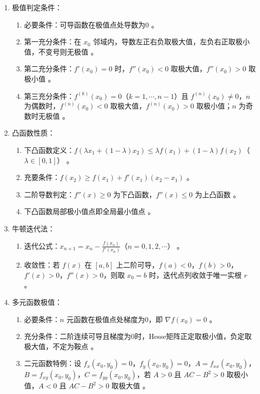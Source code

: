 \documentclass[UTF8]{ctexart}
\theoremstyle{remark}
\begin{document}
\begin{enumerate}
	\item 极值判定条件：
	\begin{enumerate}
		\item 必要条件：可导函数在极值点处导数为0 。
		\item 第一充分条件：在 \(x_0\) 邻域内，导数左正右负取极大值，左负右正取极小值，不变号则无极值 。
		\item 第二充分条件：\(f'(x_0) = 0\) 时，\(f''(x_0) < 0\) 取极大值，\(f''(x_0) > 0\) 取极小值 。
		\item 第三充分条件：\(f^{(k)}(x_0) = 0\)（\(k = 1, \cdots, n - 1\)）且 \(f^{(n)}(x_0) \neq 0\)，\(n\) 为偶数时，\(f^{(n)}(x_0) < 0\) 取极大值，\(f^{(n)}(x_0) > 0\) 取极小值；\(n\) 为奇数时无极值 。
	\end{enumerate}
	
	\item 凸函数性质：
	\begin{enumerate}
		\item 下凸函数定义：\(f(\lambda x_1 + (1 - \lambda) x_2) \leq \lambda f(x_1) + (1 - \lambda) f(x_2)\)（\(\lambda \in [0, 1]\)） 。
		\item 充要条件：\(f(x_2) \geq f(x_1) + f'(x_1)(x_2 - x_1)\) 。
		\item 二阶导数判定：\(f''(x) \geq 0\) 为下凸函数，\(f''(x) \leq 0\) 为上凸函数 。
		\item 下凸函数局部极小值点即全局最小值点 。
	\end{enumerate}
	
	\item 牛顿迭代法：
	\begin{enumerate}
		\item 迭代公式：\(x_{n+1} = x_n - \frac{f(x_n)}{f'(x_n)}\)（\(n = 0, 1, 2, \cdots\)） 。
		\item 收敛性：若 \(f(x)\) 在 \([a, b]\) 上二阶可导，\(f(a) < 0\)，\(f(b) > 0\)，\(f'(x) > 0\)，\(f''(x) > 0\)，则取 \(x_0 = b\) 时，迭代点列收敛于唯一实根 \(r\) 。
	\end{enumerate}
	
	\item 多元函数极值：
	\begin{enumerate}
		\item 必要条件：\(n\) 元函数在极值点处梯度为0，即 \(\nabla f(x_0) = 0\) 。
		\item 充分条件：二阶连续可导且梯度为0时，Hesse矩阵正定取极小值，负定取极大值，不定为鞍点 。
		\item 二元函数特例：设 \(f_x(x_0, y_0) = 0\)，\(f_y(x_0, y_0) = 0\)，\(A = f_{xx}(x_0, y_0)\)，\(B = f_{xy}(x_0, y_0)\)，\(C = f_{yy}(x_0, y_0)\)，若 \(A > 0\) 且 \(AC - B^2 > 0\) 取极小值，\(A < 0\) 且 \(AC - B^2 > 0\) 取极大值 。
	\end{enumerate}


\end{enumerate}
\end{document}
